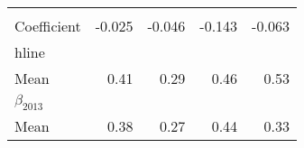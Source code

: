 \begin{tabular}{lllll}
  \multicolumn{1}{r}{} &
  \multicolumn{1}{r}{} \\
\multicolumn{1}{l}{\hspace{1em}Coefficient} &
  \multicolumn{1}{|r}{-0.025} &
  \multicolumn{1}{r}{-0.046} &
  \multicolumn{1}{r}{-0.143} &
  \multicolumn{1}{r}{-0.063} \\ hline
\multicolumn{1}{l}{$\beta_{2005}$} &
  \multicolumn{1}{|r}{} &
  \multicolumn{1}{r}{} &
  \multicolumn{1}{r}{} &
  \multicolumn{1}{r}{} \\
\multicolumn{1}{l}{\hspace{1em}Mean} &
  \multicolumn{1}{|r}{0.41} &
  \multicolumn{1}{r}{0.29} &
  \multicolumn{1}{r}{0.46} &
  \multicolumn{1}{r}{0.53} \\
\multicolumn{1}{l}{$\beta_{2013}$} &
  \multicolumn{1}{|r}{} &
  \multicolumn{1}{r}{} &
  \multicolumn{1}{r}{} &
  \multicolumn{1}{r}{} \\
\multicolumn{1}{l}{\hspace{1em}Mean} &
  \multicolumn{1}{|r}{0.38} &
  \multicolumn{1}{r}{0.27} &
  \multicolumn{1}{r}{0.44} &
  \multicolumn{1}{r}{0.33} \\
\cline{1-5}
\end{tabular}
